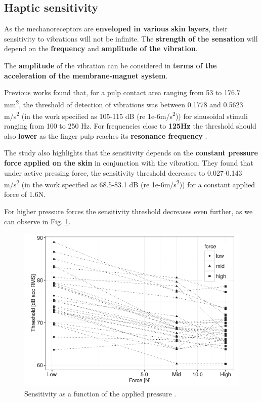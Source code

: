 \subsection{Haptic sensitivity}
\label{Haptic sensitivity}

As the mechanoreceptors are \textbf{enveloped in various skin layers}, their sensitivity to vibrations will not be infinite. The \textbf{strength of the sensation} will depend on the \textbf{frequency} and \textbf{amplitude of the vibration}. 

The \textbf{amplitude} of the vibration can be considered in \textbf{terms of the acceleration of the membrane-magnet system}.

Previous works \cite{Vibrotactile_Sensitivity} found that, for a pulp contact area ranging from 53 to 176.7 mm\textsuperscript{2}, the threshold of detection of vibrations was between 0.1778 and 0.5623 m/s\textsuperscript{2} (in the work specified as 105-115 dB (re 1e-6m/s\textsuperscript{2})) for sinusoidal stimuli ranging from 100 to 250 Hz. 
For frequencies close to \textbf{125Hz} the threshold should also \textbf{lower} as the finger pulp reaches its \textbf{resonance frequency} \cite{Skin_freqs_penetration}.

The study also highlights that the sensitivity depends on the \textbf{constant pressure force applied on the skin} in conjunction with the vibration.
They found that under active pressing force, the sensitivity threshold decreases to 0.027-0.143 m/s\textsuperscript{2} (in the work specified as 68.5-83.1 dB (re 1e-6m/s\textsuperscript{2})) for a constant applied force of 1.6N.

\begin{samepage}
    For higher pressure forces the sensitivity threshold decreases even further, as we can observe in Fig. \ref{fig: Vibrotactile_Sensitivity}.
    \begin{figure}[H]
        \centering
        \includegraphics[width=0.5\linewidth]{Chapters/Chapter3/Haptics_Physics/Figures/vibr_thr_vs_pressure_force.png}
        \caption{Sensitivity as a function of the applied pressure \cite{Skin_freqs_penetration}.}
        \label{fig: Vibrotactile_Sensitivity}
    \end{figure}
\end{samepage}

